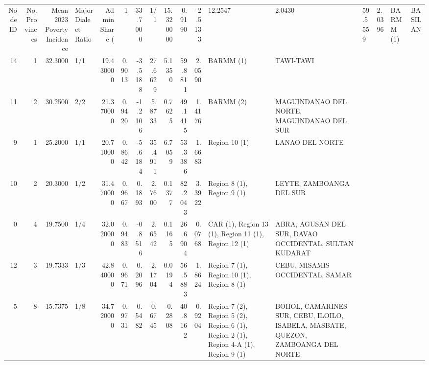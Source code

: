 \begin{tabular}{rrrlrrrrrrrll}
\toprule
Node ID & No. Provinces & Mean 2023 Poverty Incidence & Major Dialect Ratio & Admin Share (%
 & 1 & {} \color[HTML]{F1F1F1} 33.7000 & 1/1 & {} \color[HTML]{F1F1F1} 15.320000 & 0.9190 & -2.5133 & 12.2547 & 2.0430 & 59.5559 & 2.0396 & BARMM (1) & BASILAN \\
14 & 1 & {} \color[HTML]{F1F1F1} 32.3000 & 1/1 & {} \color[HTML]{F1F1F1} 19.430000 & 0.9013 & -3.5188 & 27.6629 & 5.1350 & 59.8811 & 2.0590 & BARMM (1) & TAWI-TAWI \\
11 & 2 & {} \color[HTML]{F1F1F1} 30.2500 & 2/2 & {} \color[HTML]{F1F1F1} 21.370000 & 0.9420 & -1.2106 & 5.8733 & 0.7625 & 49.1415 & 1.4176 & BARMM (2) & MAGUINDANAO DEL NORTE, MAGUINDANAO DEL SUR \\
9 & 1 & {} \color[HTML]{000000} 25.2000 & 1/1 & {} \color[HTML]{F1F1F1} 20.710000 & 0.8642 & -5.6184 & 35.4911 & 6.7059 & 53.3386 & 1.6683 & Region 10 (1) & LANAO DEL NORTE \\
10 & 2 & {} \color[HTML]{000000} 20.3000 & 1/2 & {} \color[HTML]{000000} 31.470000 & 0.9667 & 0.1893 & 2.7600 & 0.1377 & 82.2043 & 3.3922 & Region 8 (1), Region 9 (1) & LEYTE, ZAMBOANGA DEL SUR \\
0 & 4 & {} \color[HTML]{000000} 19.7500 & 1/4 & {} \color[HTML]{000000} 32.020000 & 0.9483 & -0.8516 & 2.6542 & 0.1165 & 26.6904 & 0.0768 & CAR (1), Region 13 (1), Region 11 (1), Region 12 (1) & ABRA, AGUSAN DEL SUR, DAVAO OCCIDENTAL, SULTAN KUDARAT \\
12 & 3 & {} \color[HTML]{000000} 19.7333 & 1/3 & {} \color[HTML]{F1F1F1} 42.840000 & 0.9671 & 0.2096 & 2.1704 & 0.0194 & 56.5883 & 1.8624 & Region 7 (1), Region 10 (1), Region 8 (1) & CEBU, MISAMIS OCCIDENTAL, SAMAR \\
5 & 8 & {} \color[HTML]{000000} 15.7375 & 1/8 & {} \color[HTML]{000000} 34.720000 & 0.9731 & 0.5482 & 0.6745 & -0.2808 & 40.8162 & 0.9204 & Region 7 (2), Region 5 (2), Region 6 (1), Region 2 (1), Region 4-A (1), Region 9 (1) & BOHOL, CAMARINES SUR, CEBU, ILOILO, ISABELA, MASBATE, QUEZON, ZAMBOANGA DEL NORTE \\

\end{tabular}
